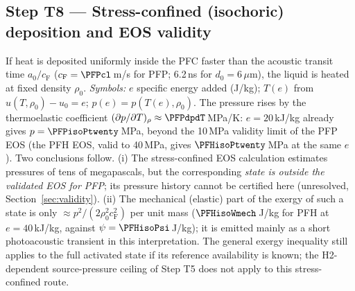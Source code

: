 \subsection{Step T8 --- Stress-confined (isochoric) deposition and EOS validity}\label{sec:isochoric}
If heat is deposited uniformly inside the PFC faster than the acoustic transit time
$a_0/c_{\mathrm F}$ ($c_{\mathrm F}=\PFPcl$\,m/s for PFP; 6.2\,ns for $d_0=6\,\mu$m), the liquid is heated at
fixed density $\rho_0$. \emph{Symbols:} $e$ specific energy added (J/kg); $T(e)$ from
$u(T,\rho_0)-u_0=e$; $p(e)=p(T(e),\rho_0)$. The pressure rises by the thermoelastic coefficient
$(\partial p/\partial T)_\rho\approx\PFPdpdT$\,MPa/K: $e=20$\,kJ/kg already gives $p=\PFPisoPtwenty$\,MPa,
beyond the 10\,MPa validity limit of the PFP EOS (the PFH EOS, valid to 40\,MPa, gives
$\PFHisoPtwenty$\,MPa at the same $e$). Two conclusions follow. (i) The stress-confined EOS calculation
estimates pressures of tens of megapascals, but the corresponding \emph{state is outside the validated EOS for PFP}; its pressure
history cannot be certified here (unresolved, Section~\ref{sec:validity}). (ii) The mechanical
(elastic) part of the exergy of such a state is only $\approx p^2/(2\rho_0^2c_{\mathrm F}^2)$ per unit mass
($\PFHisoWmech$\,J/kg for PFH at $e=40$\,kJ/kg, against $\psi=\PFHisoPsi$\,J/kg); it is emitted mainly as
a short photoacoustic transient in this interpretation. The general exergy inequality still applies
to the full activated state if its reference availability is known; the H2-dependent source-pressure
ceiling of Step T5 does not apply to this stress-confined route.


